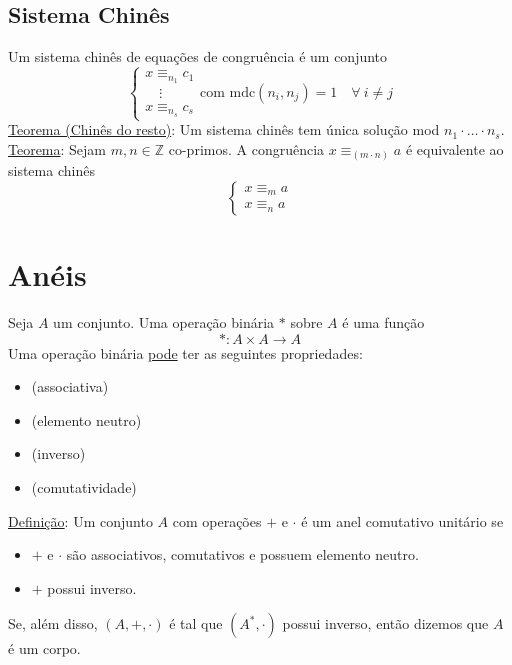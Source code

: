 \documentclass{article}
\begin{document}
\subsection{Sistema Chinês}
Um sistema chinês de equações de congruência é um conjunto
\[
  \begin{cases}
    x \equiv_{n_1} c_1 \\
    \quad \vdots \\
    x \equiv_{n_s} c_s
  \end{cases}
  \text{com mdc}(n_i, n_j) = 1 \quad \forall\: i \neq j
\]
\uline{Teorema (Chinês do resto)}: Um sistema chinês tem única solução mod $n_1 \cdot \hdots \cdot n_s$. \\[10pt]
\uline{Teorema}: Sejam $m, n \in \mathbb{Z}$ co-primos. A congruência $x \equiv_{(m \cdot n)} a$ é equivalente ao sistema chinês
\[
  \begin{cases}
    x \equiv_m a \\
    x \equiv_n a
  \end{cases}
\]



\section{Anéis}
Seja $A$ um conjunto. Uma operação binária $*$ sobre $A$ é uma função
\[ *: A \times A \to A \]
Uma operação binária \uline{pode} ter as seguintes propriedades:
\begin{itemize}
  \item {} (associativa)
  \item {} (elemento neutro)
  \item {} (inverso)
  \item {} (comutatividade)
\end{itemize}
\vspace{10pt}
\uline{Definição}: Um conjunto $A$ com operações $+$ e $\cdot$ é um anel comutativo unitário se
\begin{itemize}
  \item $+$ e $\cdot$ são associativos, comutativos e possuem elemento neutro.
  \item $+$ possui inverso.
\end{itemize}
\vspace{5pt}
Se, além disso, $(A, +, \cdot)$ é tal que $(A^*, \cdot)$ possui inverso, então dizemos que $A$ é um corpo.
\end{document}
